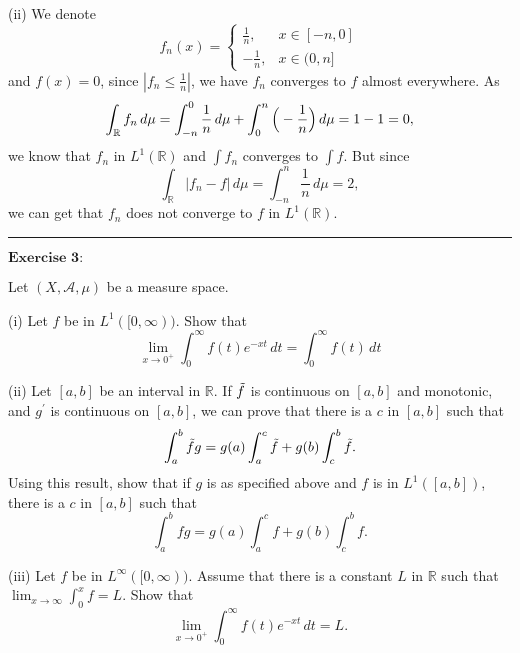 \documentclass[12pt,a4paper]{ctexart}
\begin{document}
(ii) We denote
\begin{equation*}
f_{n} (x) =
\left\{
             \begin{array}{cl}
             \frac{1}{n}, & x \in [-n, 0] \\
             - \frac{1}{n}, & x \in (0, n]
             \end{array}
\right.
\end{equation*}
and $f(x) = 0$, since $|f_{n} \leq \frac{1}{n}|$, we have $f_{n}$ converges to $f$ almost everywhere. As
\begin{equation*}
    \int_{\mathbb{R}}^{} f_{n} \, d \mu = \int_{-n}^{0} \frac{1}{n} \, d \mu + \int_{0}^{n} \Big{(} - \frac{1}{n} \Big{)} \, d \mu = 1 - 1 = 0,
\end{equation*}
we know that $f_{n}$ in $L^{1}(\mathbb{R})$ and $\int f_{n}$ converges to $\int f$. But since
\begin{equation*}
    \int_{\mathbb{R}}^{} |f_{n} - f| \, d \mu = \int_{-n}^{n} \frac{1}{n} \, d \mu = 2,
\end{equation*}
we can get that $f_{n}$ does not converge to $f$ in $L^{1}(\mathbb{R})$.


\noindent\rule[0.25\baselineskip]{\textwidth}{0.5pt}

\vspace{8pt}

$\textbf{Exercise 3:}$

Let $(X, \mathcal{A}, \mu)$ be a measure space.

(i) Let $f$ be in $L^{1}([0, \infty))$. Show that
\begin{equation*}
    \lim_{x \to 0^{+}} \int_{0}^{\infty} f(t) e^{- x t} \, d t = \int_{0}^{\infty} f(t) \, d t
\end{equation*}

(ii) Let $[a, b]$ be an interval in $\mathbb{R}$. If $\Tilde{f}$ is continuous on $[a, b]$ and monotonic, and $g^{'}$ is continuous on $[a, b]$, we can prove that there is a $c$ in $[a, b]$ such that
\begin{equation*}
    \int_{a}^{b} \Tilde{f} g = g(a) \int_{a}^{c} \Tilde{f} + g(b) \int_{c}^{b} \Tilde{f}.
\end{equation*}
Using this result, show that if $g$ is as specified above and $f$ is in $L^{1}([a, b])$, there is a $c$ in $[a, b]$ such that 
\begin{equation*}
    \int_{a}^{b} f g = g(a) \int_{a}^{c} f + g(b) \int_{c}^{b} f.
\end{equation*}

(iii) Let $f$ be in $L^{\infty}([0, \infty))$. Assume that there is a constant $L$ in $\mathbb{R}$ such that $\lim_{x \to \infty} \int_{0}^{x} f = L$. Show that 
\begin{equation*}
    \lim_{x \to 0^{+}} \int_{0}^{ \infty} f(t) e^{- x t} \, d t = L.
\end{equation*}
\end{document}
